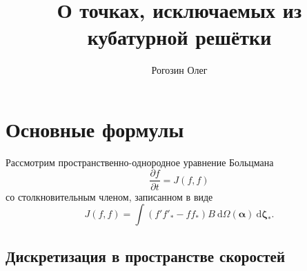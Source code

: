 \documentclass[a4paper,12pt]{article}
\title{О точках, исключаемых из кубатурной решётки}
\author{Рогозин Олег}
\newcommand{\dd}{\:\mathrm{d}}
\newcommand{\pder}[2][]{\frac{\partial#1}{\partial#2}}
\newcommand{\dzeta}{\boldsymbol{\dd\zeta}}
\begin{document}
\maketitle
\tableofcontents

\section{Основные формулы}

Рассмотрим пространственно-однородное уравнение Больцмана
\begin{equation}\label{eq:Boltzmann}
    \pder[f]{t} = J(f,f)
\end{equation}
со столкновительным членом, записанном в виде
\begin{equation}\label{eq:ci}
    J(f,f) = \int (f'f'_*-ff_*)B\dd\Omega(\boldsymbol\alpha)\dzeta_*.
\end{equation}

\subsection{Дискретизация в пространстве скоростей}
\end{document}

